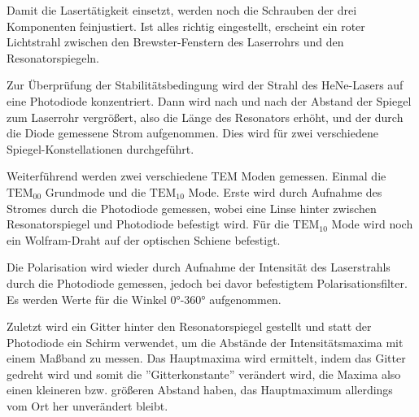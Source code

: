 \noindent Damit die Lasertätigkeit einsetzt, werden noch die Schrauben der drei Komponenten feinjustiert. Ist alles richtig eingestellt, erscheint ein roter Lichtstrahl zwischen den Brewster-Fenstern des Laserrohrs und den Resonatorspiegeln.

\noindent Zur Überprüfung der Stabilitätsbedingung wird der Strahl des HeNe-Lasers auf eine Photodiode konzentriert. Dann wird nach und nach der Abstand der Spiegel zum Laserrohr vergrößert, also die Länge des Resonators erhöht, und der durch die Diode gemessene Strom aufgenommen. Dies wird für zwei verschiedene Spiegel-Konstellationen durchgeführt.

\noindent Weiterführend werden zwei verschiedene TEM Moden gemessen. Einmal die \(\text{TEM}_{00}\) Grundmode und die \(\text{TEM}_{10}\) Mode. Erste wird durch Aufnahme des Stromes durch die Photodiode gemessen, wobei eine Linse hinter zwischen Resonatorspiegel und Photodiode befestigt wird. Für die \(\text{TEM}_{10}\) Mode wird noch ein Wolfram-Draht auf der optischen Schiene befestigt.

\noindent Die Polarisation wird wieder durch Aufnahme der Intensität des Laserstrahls durch die Photodiode gemessen, jedoch bei davor befestigtem Polarisationsfilter. Es werden Werte für die Winkel 0°-360° aufgenommen.

\noindent Zuletzt wird ein Gitter hinter den Resonatorspiegel gestellt und statt der Photodiode ein Schirm verwendet, um die Abstände der Intensitätsmaxima mit einem Maßband zu messen. Das Hauptmaxima wird ermittelt, indem das Gitter gedreht wird und somit die ''Gitterkonstante'' verändert wird, die Maxima also einen kleineren bzw. größeren Abstand haben, das Hauptmaximum allerdings vom Ort her unverändert bleibt.